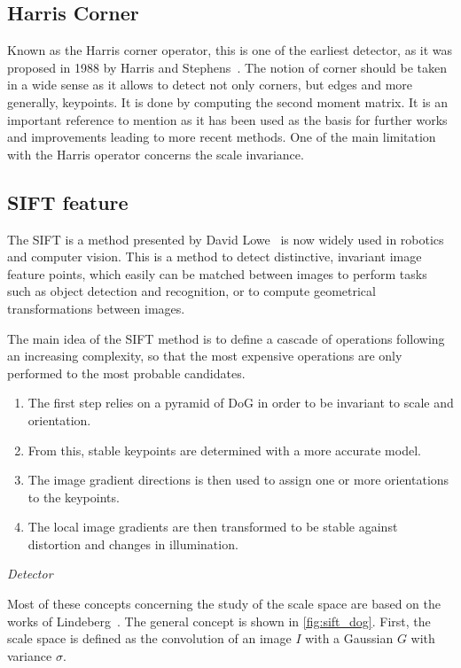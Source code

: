 \subsection{Harris Corner}

Known as the Harris corner operator, this is one of the earliest detector, as it was proposed in 1988 by Harris and Stephens~\cite{Harris88alvey}. The  notion of corner should be taken in a wide sense as it allows to detect not only corners, but edges and more generally, keypoints. It is done by computing the second moment matrix. It is an important reference to mention as it has been used as the basis for further works and improvements leading to more recent methods. One of the main limitation with the Harris operator concerns the scale invariance.

\subsection{SIFT feature}

The \gls{SIFT} is a method presented by David Lowe~\cite{lowe_2004_sift} is now widely used in robotics and computer vision.
This is a method to detect distinctive, invariant image feature points, which easily can be matched between images to perform tasks such as object detection and recognition, or to compute geometrical transformations between images.

The main idea of the \gls{SIFT} method is to define a cascade of operations following an increasing complexity, so that the most expensive operations are only performed to the most probable candidates.
\begin{enumerate}
\item The first step relies on a pyramid of \gls{DoG} in order to be invariant to scale and orientation.
\item From this, stable keypoints are determined with a more accurate model.
\item The image gradient directions is then used to assign one or more orientations to the keypoints.
\item The local image gradients are then transformed to be stable against distortion and changes in illumination.
\end{enumerate}

\emph{Detector}

Most of these concepts concerning the study of the scale space are based on the works of Lindeberg~\cite{Lindeberg_1994}. The general concept is shown in \ref{fig:sift_dog}. First, the scale space is defined as the convolution of an image $I$ with a Gaussian $G$ with variance $\sigma$.

